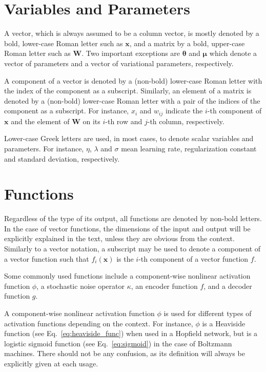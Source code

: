 \documentclass{now}
\newcommand{\vect}[1]{\mathbf{#1}}
\newcommand{\vects}[1]{\boldsymbol{#1}}
\newcommand{\matr}[1]{\mathbf{#1}}
\newcommand{\vx}[0]{\vect{x}}
\newcommand{\mW}[0]{\matr{W}}
\newcommand{\vmu}[0]{\vects{\mu}}
\newcommand{\TT}[0]{{\vects{\theta}}}
\begin{document}
\section*{Variables and Parameters}

A vector, which is always assumed to be a column vector, is mostly denoted by a
bold, lower-case Roman letter such as $\vx$, and a matrix by a bold, upper-case
Roman letter such as $\mW$. Two important exceptions are $\TT$ and $\vmu$ which
denote a vector of parameters and a vector of variational parameters,
respectively.

A component of a vector is denoted by a (non-bold) lower-case Roman letter with
the index of the component as a subscript.  Similarly, an element of a matrix
is denoted by a (non-bold) lower-case Roman letter with a pair of the indices
of the component as a subscript. For instance, $x_i$ and $w_{ij}$ indicate the
$i$-th component of $\vx$ and the element of $\mW$ on its $i$-th row and $j$-th
column, respectively.

Lower-case Greek letters are used, in most cases, to denote scalar variables
and parameters. For instance, $\eta$, $\lambda$ and $\sigma$ mean learning
rate, regularization constant and standard deviation, respectively. 

\section*{Functions}

Regardless of the type of its output, all functions are denoted by non-bold
letters. In the case of vector functions, the dimensions of the input and
output will be explicitly explained in the text, unless they are obvious from
the context. Similarly to a vector notation, a subscript may be used to denote
a component of a vector function such that $f_i(\vx)$ is the $i$-th component
of a vector function $f$.

Some commonly used functions include a component-wise nonlinear activation
function $\phi$, a stochastic noise operator $\kappa$, an encoder function $f$,
and a decoder function $g$.

A component-wise nonlinear activation function $\phi$ is used for different
types of activation functions depending on the context. For instance, $\phi$ is
a Heaviside function (see Eq.~\eqref{eq:heaviside_func}) when used in a
Hopfield network, but is a logistic sigmoid function (see
Eq.~\eqref{eq:sigmoid}) in the case of Boltzmann machines.  There should not be
any confusion, as its definition will always be explicitly given at each usage.
\end{document}
